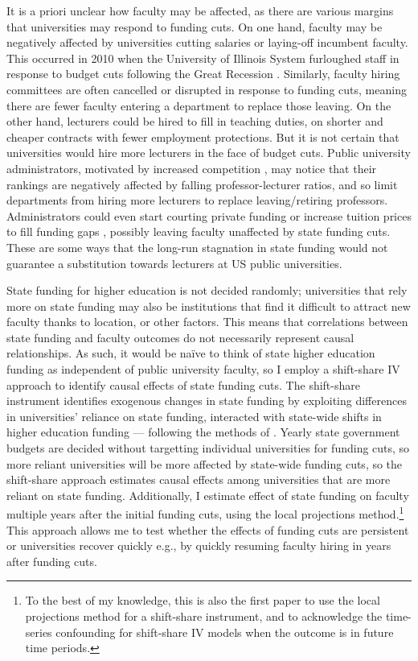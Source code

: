 It is a priori unclear how faculty may be affected, as there are various margins that universities may respond to funding cuts.
On one hand, faculty may be negatively affected by universities cutting salaries or laying-off incumbent faculty.
This occurred in 2010 when the University of Illinois System furloughed staff in response to budget cuts following the Great Recession \citep{furlough2010}.
Similarly, faculty hiring committees are often cancelled or disrupted in response to funding cuts, meaning there are fewer faculty entering a department to replace those leaving.
On the other hand, lecturers could be hired to fill in teaching duties, on shorter and cheaper contracts with fewer employment protections.
But it is not certain that universities would hire more lecturers in the face of budget cuts.
Public university administrators, motivated by increased competition \citep{hoxby2009changing,urquiola2020markets}, may notice that their rankings are negatively affected by falling professor-lecturer ratios, and so limit departments from hiring more lecturers to replace leaving/retiring professors.
Administrators could even start courting private funding or increase tuition prices to fill funding gaps \citep{bound2019public}, possibly leaving faculty unaffected by state funding cuts.
These are some ways that the long-run stagnation in state funding would not guarantee a substitution towards lecturers at US public universities.

State funding for higher education is not decided randomly;
universities that rely more on state funding may also be institutions that find it difficult to attract new faculty thanks to location, or other factors.
This means that correlations between state funding and faculty outcomes do not necessarily represent causal relationships.
As such, it would be na\"ive to think of state higher education funding as independent of public university faculty, so I employ a shift-share IV approach to identify causal effects of state funding cuts.
The shift-share instrument identifies exogenous changes in state funding by exploiting differences in universities' reliance on state funding, interacted with state-wide shifts in higher education funding --- following the methods of \cite{NBERw23736,NBERw27885}.
Yearly state government budgets are decided without targetting individual universities for funding cuts, so more reliant universities will be more affected by state-wide funding cuts, so the shift-share approach estimates causal effects among universities that are more reliant on state funding.
Additionally, I estimate effect of state funding on faculty multiple years after the initial funding cuts, using the local projections method.\footnote{
    To the best of my knowledge, this is also the first paper to use the local projections method for a shift-share instrument, and to acknowledge the time-series confounding for shift-share IV models when the outcome is in future time periods.
}
This approach allows me to test whether the effects of funding cuts are persistent or universities recover quickly e.g., by quickly resuming faculty hiring in years after funding cuts.

